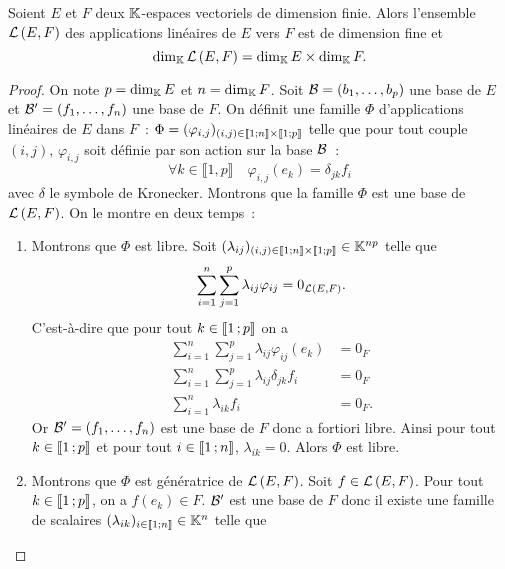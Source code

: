 \begin{theo}
  Soient \(E\) et \(F\) deux \(\mathbb{K}\)-espaces vectoriels de dimension finie. Alors l'ensemble \(\mathcal{L}\left(E,F\right)\) des applications linéaires de \(E\) vers \(F\) est de dimension fine et
  \begin{equation}
    \operatorname{dim}_{\mathbb{K}} \mathcal{L}\left(E,F\right) = \operatorname{dim}_{\mathbb{K}} E \times \operatorname{dim}_{\mathbb{K}} F.
  \end{equation}
\end{theo}
\begin{proof}
    On note \(p=\operatorname{dim}_{\mathbb{K}} E\) et \(n=\operatorname{dim}_{\mathbb{K}} F\). Soit \(\mathcal{B}=(b_1, \ldots, b_p)\) une base de \(E\) et \(\mathcal{B}'=(f_1, \ldots, f_n)\) une base de \(F\). On définit une famille \(\Phi\) d'applications linéaires de \(E\) dans \(F\)~: \(\Phi = (\varphi_{i,j})_{(i,j) \in \mathopen{\llbracket}1\mathclose{}\mathpunct{};n\mathclose{\rrbracket} \times \mathopen{\llbracket}1\mathclose{}\mathpunct{};p\mathclose{\rrbracket}}\) telle que pour tout couple \((i,j)\), \(\varphi_{i,j}\) soit définie par son action sur la base \(\mathcal{B}\)~:
  \begin{equation}
    \forall k \in \llbracket 1,p \rrbracket \quad \varphi_{i,j}(e_k)= \delta_{jk} f_i
  \end{equation}
  avec \(\delta\) le symbole de Kronecker. Montrons que la famille \(\Phi\) est une base de \(\mathcal{L}\left(E,F\right)\). On le montre en deux temps~:
  \begin{enumerate}
  \item Montrons que \(\Phi\) est libre. Soit \((\lambda_{ij})_{(i,j) \in \mathopen{\llbracket}1\mathclose{}\mathpunct{};n\mathclose{\rrbracket} \times \mathopen{\llbracket}1\mathclose{}\mathpunct{};p\mathclose{\rrbracket}} \in \mathbb{K}^{np}\) telle que
    \begin{equation}
        \sum_{i=1}^n \sum_{j=1}^p \lambda_{ij} \varphi_{ij} =0_{\mathcal{L}\left(E,F\right)}.
    \end{equation}
    C'est-à-dire que pour tout \(k \in \mathopen{\llbracket}1\mathclose{}\mathpunct{};p\mathclose{\rrbracket}\) on a
    \begin{align}
      \sum_{i=1}^n \sum_{j=1}^p \lambda_{ij} \varphi_{ij}(e_k) &=0_F\\
      \sum_{i=1}^n \sum_{j=1}^p \lambda_{ij} \delta_{jk} f_i &=0_F\\
      \sum_{i=1}^n \lambda_{ik} f_i &=0_F.
    \end{align}
    Or \(\mathcal{B}'=(f_1, \ldots, f_n)\) est une base de \(F\) donc a fortiori libre. Ainsi pour tout \(k \in \mathopen{\llbracket}1\mathclose{}\mathpunct{};p\mathclose{\rrbracket}\) et pour tout \(i \in \mathopen{\llbracket}1\mathclose{}\mathpunct{};n\mathclose{\rrbracket}\), \(\lambda_{ik}=0\). Alors \(\Phi\) est libre.
  \item  Montrons que \(\Phi\) est génératrice de \(\mathcal{L}\left(E,F\right)\). Soit \(f \in \mathcal{L}\left(E,F\right)\). Pour tout \(k \in \mathopen{\llbracket}1\mathclose{}\mathpunct{};p\mathclose{\rrbracket}\), on a \(f(e_k) \in F\). \(\mathcal{B}'\) est une base de \(F\) donc il existe une famille de scalaires \((\lambda_{ik})_{i \in  \mathopen{\llbracket}1\mathclose{}\mathpunct{};n\mathclose{\rrbracket}} \in \mathbb{K}^n\) telle que

\end{enumerate}
\end{proof}
